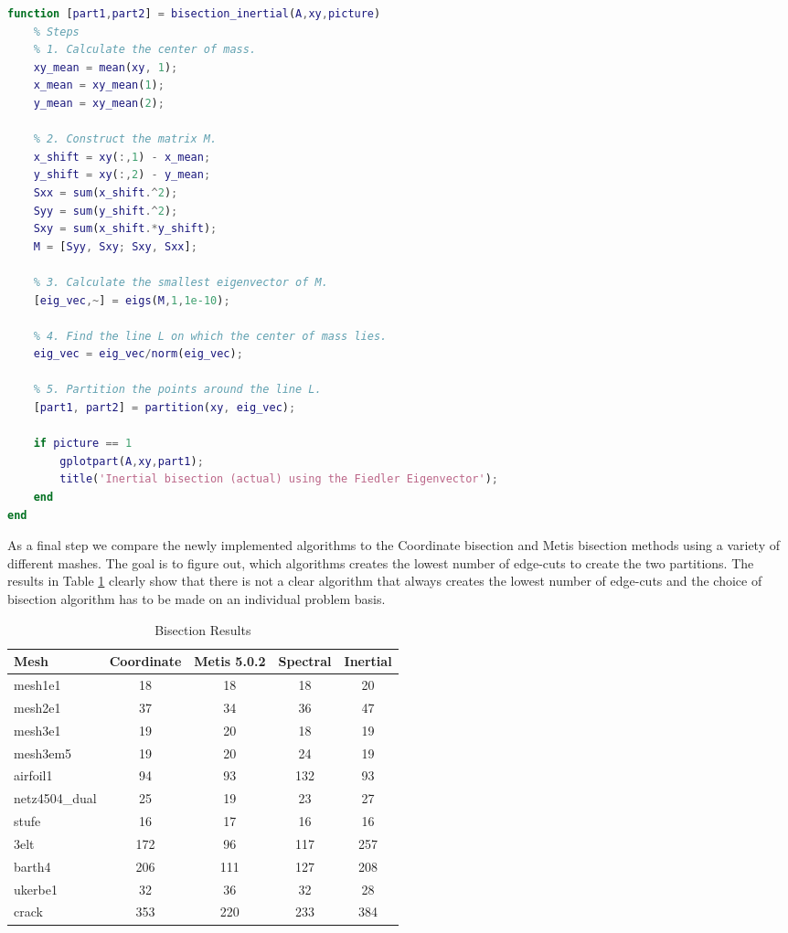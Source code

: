 \begin{lstlisting}[language=Matlab, caption=Inertial graph bisection implementation, label=lst:inert]
function [part1,part2] = bisection_inertial(A,xy,picture)
	% Steps
	% 1. Calculate the center of mass.
	xy_mean = mean(xy, 1);
	x_mean = xy_mean(1);
	y_mean = xy_mean(2);

	% 2. Construct the matrix M.
	x_shift = xy(:,1) - x_mean;
	y_shift = xy(:,2) - y_mean;
	Sxx = sum(x_shift.^2);
	Syy = sum(y_shift.^2);
	Sxy = sum(x_shift.*y_shift);
	M = [Syy, Sxy; Sxy, Sxx];
	
	% 3. Calculate the smallest eigenvector of M.
	[eig_vec,~] = eigs(M,1,1e-10);

	% 4. Find the line L on which the center of mass lies.
	eig_vec = eig_vec/norm(eig_vec);

	% 5. Partition the points around the line L.
	[part1, part2] = partition(xy, eig_vec);

	if picture == 1
		gplotpart(A,xy,part1);
		title('Inertial bisection (actual) using the Fiedler Eigenvector');
	end
end
\end{lstlisting}
As a final step we compare the newly implemented algorithms to the Coordinate bisection and Metis bisection methods using a variety of different mashes. The goal is to figure out, which algorithms creates the lowest number of edge-cuts to create the two partitions.
The results in Table \ref{tab:meshdata} clearly show that there is not a clear algorithm that always creates the lowest number of edge-cuts and the choice of bisection algorithm has to be made on an individual problem basis.


\begin{table}[H]
	\centering
	\begin{tabular}{lcccc}
		\toprule
		Mesh           & Coordinate & Metis 5.0.2 & Spectral & Inertial \\
		\midrule
		mesh1e1        & 18         & 18          & 18       & 20       \\
		mesh2e1        & 37         & 34          & 36       & 47       \\
		mesh3e1        & 19         & 20          & 18       & 19       \\
		mesh3em5       & 19         & 20          & 24       & 19       \\
		airfoil1       & 94         & 93          & 132      & 93       \\
		netz4504\_dual & 25         & 19          & 23       & 27       \\
		stufe          & 16         & 17          & 16       & 16       \\
		3elt           & 172        & 96          & 117      & 257      \\
		barth4         & 206        & 111         & 127      & 208      \\
		ukerbe1        & 32         & 36          & 32       & 28       \\
		crack          & 353        & 220         & 233      & 384      \\
		\bottomrule
	\end{tabular}
	\caption{Bisection Results}
	\label{tab:meshdata}
\end{table}


